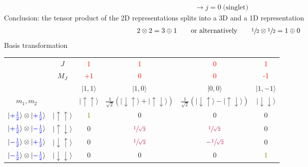 \documentclass[../main.tex]{subfiles}
\begin{document}
\begin{itemize}
\begin{align}
&\rightarrow j=0 \;\text{(singlet)}
\end{align}
Conclusion: the tensor product of the 2D representations splits into a 3D and a 1D representation
\begin{align}
2\otimes2=3\oplus1\qquad \text{or alternatively}\qquad \sfrac{1}{2}\otimes\sfrac{1}{2}=1\oplus0
\end{align}
Basis transformation
\begin{table}[!h]
\centering
\begin{tabular}{c|c || c c c c }
&$J$&\textcolor{red}{1}&\textcolor{red}{1}&\textcolor{red}{0}&\textcolor{red}{1}\\
&$M_J$&\textcolor{red}{+1}&\textcolor{red}{0}&\textcolor{red}{0}&\textcolor{red}{-1}\\
&& $|1,1\rangle$ 
& $|1,0\rangle$
& $|0,0\rangle$
& $|1,-1\rangle$\\  \hline
$m_1,m_2$&& $|\uparrow\uparrow\rangle$
& $\frac{1}{\sqrt{2}}(|\downarrow\uparrow\rangle+|\uparrow\downarrow\rangle)$
& $\frac{1}{\sqrt{2}}(|\downarrow\uparrow\rangle-|\uparrow\downarrow\rangle)$
& $|\downarrow\downarrow\rangle$\\ \hline\hline
$|\textcolor{blue}{+\frac{1}{2}}\rangle\otimes|\textcolor{blue}{+\frac{1}{2}}\rangle$&$|\uparrow\uparrow\rangle$ & \textcolor{olive}{1} & 0 & 0 & 0\\
$|\textcolor{blue}{+\frac{1}{2}}\rangle\otimes|\textcolor{blue}{-\frac{1}{2}}\rangle$&$|\uparrow\downarrow\rangle$ & 0 & $\textcolor{purple}{\sfrac{1}{\sqrt{2}}}$ & $\textcolor{purple}{\sfrac{1}{\sqrt{2}}}$ & 0\\
$|\textcolor{blue}{-\frac{1}{2}}\rangle\otimes|\textcolor{blue}{+\frac{1}{2}}\rangle$&$|\downarrow\uparrow\rangle$ & 0 & $\textcolor{purple}{\sfrac{1}{\sqrt{2}}}$ & $-\textcolor{purple}{\sfrac{1}{\sqrt{2}}}$ & 0\\
$|\textcolor{blue}{-\frac{1}{2}}\rangle\otimes|\textcolor{blue}{-\frac{1}{2}}\rangle$&$|\downarrow\downarrow\rangle$ & 0 & 0 & 0 & \textcolor{olive}{1}
\end{tabular}
\end{table}


\end{itemize}
\end{document}
